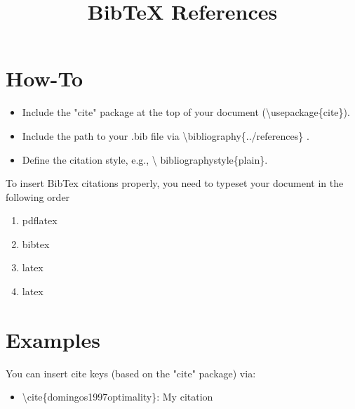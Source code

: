 \documentclass{article}
\title{BibTeX References}
\begin{document}

\maketitle %


\section{How-To}

\begin{itemize}

\item Include the "cite" package at the top of your document (\textbackslash{usepackage\{cite\}}).
\item Include the path to your .bib file via \textbackslash{}bibliography\{../references\} .
\item Define the citation style, e.g., \textbackslash{} bibliographystyle\{plain\}. 

\end{itemize}


To insert BibTex citations properly, you need to typeset your document in the following order

\begin{enumerate}
\item pdflatex
\item bibtex
\item latex
\item latex
\end{enumerate}

\section{Examples}

You can insert cite keys (based on the "cite" package) via:

\begin{itemize}
\item  \textbackslash{}cite\{domingos1997optimality\}: My citation \cite{domingos1997optimality}
\end{itemize}



\end{document}
